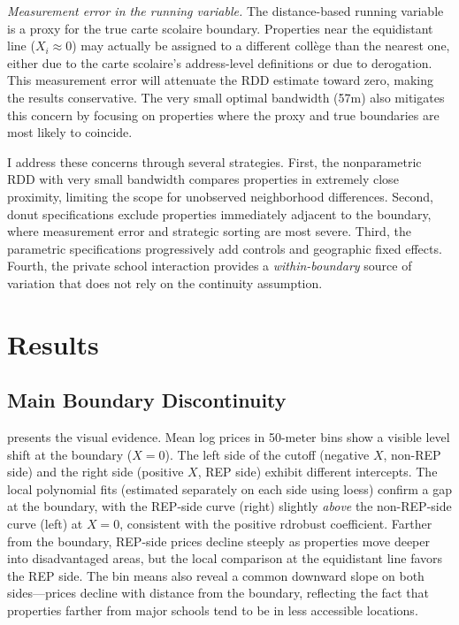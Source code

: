 \documentclass[12pt]{article}
\begin{document}
\textit{Measurement error in the running variable.} The distance-based running variable is a proxy for the true carte scolaire boundary. Properties near the equidistant line ($X_i \approx 0$) may actually be assigned to a different coll\`{e}ge than the nearest one, either due to the carte scolaire's address-level definitions or due to derogation. This measurement error will attenuate the RDD estimate toward zero, making the results conservative. The very small optimal bandwidth (57m) also mitigates this concern by focusing on properties where the proxy and true boundaries are most likely to coincide.

I address these concerns through several strategies. First, the nonparametric RDD with very small bandwidth compares properties in extremely close proximity, limiting the scope for unobserved neighborhood differences. Second, donut specifications exclude properties immediately adjacent to the boundary, where measurement error and strategic sorting are most severe. Third, the parametric specifications progressively add controls and geographic fixed effects. Fourth, the private school interaction provides a \textit{within-boundary} source of variation that does not rely on the continuity assumption.


\section{Results}\label{sec:results}

\subsection{Main Boundary Discontinuity}

 presents the visual evidence. Mean log prices in 50-meter bins show a visible level shift at the boundary ($X = 0$). The left side of the cutoff (negative $X$, non-REP side) and the right side (positive $X$, REP side) exhibit different intercepts. The local polynomial fits (estimated separately on each side using loess) confirm a gap at the boundary, with the REP-side curve (right) slightly \textit{above} the non-REP-side curve (left) at $X = 0$, consistent with the positive rdrobust coefficient. Farther from the boundary, REP-side prices decline steeply as properties move deeper into disadvantaged areas, but the local comparison at the equidistant line favors the REP side. The bin means also reveal a common downward slope on both sides---prices decline with distance from the boundary, reflecting the fact that properties farther from major schools tend to be in less accessible locations.
\end{document}
